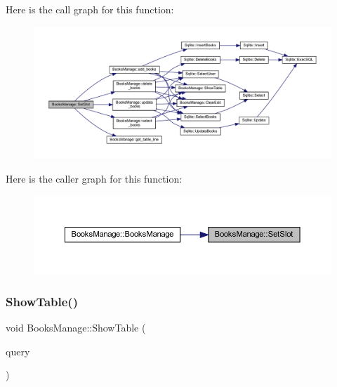 Here is the call graph for this function\+:
\nopagebreak
\begin{figure}[H]
\begin{center}
\leavevmode
\includegraphics[width=350pt]{class_books_manage_a0ee0a3e432c7789497c17758d1f82fdf_cgraph}
\end{center}
\end{figure}
Here is the caller graph for this function\+:
\nopagebreak
\begin{figure}[H]
\begin{center}
\leavevmode
\includegraphics[width=350pt]{class_books_manage_a0ee0a3e432c7789497c17758d1f82fdf_icgraph}
\end{center}
\end{figure}
\mbox{\label{class_books_manage_abbacf5e112bdee769aaa4d22c0e14744}} 
\subsubsection{\texorpdfstring{ShowTable()}{ShowTable()}}
{\footnotesize\ttfamily void Books\+Manage\+::\+Show\+Table (\begin{DoxyParamCaption}\item[{Q\+Sql\+Query}]{query }\end{DoxyParamCaption})}

